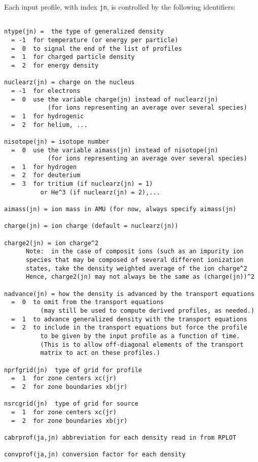 Each input profile, with index {\tt jn}, is controlled by the following
identifiers:
\begin{verbatim}

ntype(jn) =  the type of generalized density 
  = -1  for temperature (or energy per particle)
  =  0  to signal the end of the list of profiles
  =  1  for charged particle density
  =  2  for energy density
             
nuclearz(jn) = charge on the nucleus
  = -1  for electrons
  =  0  use the variable charge(jn) instead of nuclearz(jn)
            (for ions representing an average over several species)
  =  1  for hydrogenic
  =  2  for helium, ...

nisotope(jn) = isotope number
  =  0  use the variable aimass(jn) instead of nisotope(jn)
            (for ions representing an average over several species)
  =  1  for hydrogen
  =  2  for deuterium
  =  3  for tritium (if nuclearz(jn) = 1) 
          or He^3 (if nuclearz(jn) = 2),...

aimass(jn) = ion mass in AMU (for now, always specify aimass(jn)

charge(jn) = ion charge (default = nuclearz(jn))

charge2(jn) = ion charge^2
      Note:  in the case of composit ions (such as an impurity ion
      species that may be composed of several different ionization
      states, take the density weighted average of the ion charge^2
      Hence, charge2(jn) may not always be the same as (charge(jn))^2

nadvance(jn) = how the density is advanced by the transport equations
  =  0  to omit from the transport equations
          (may still be used to compute derived profiles, as needed.)
  =  1  to advance generalized density with the transport equations
  =  2  to include in the transport equations but force the profile
          to be given by the input profile as a function of time.
          (This is to allow off-diagonal elements of the transport
          matrix to act on these profiles.)

nprfgrid(jn)  type of grid for profile
  =  1  for zone centers xc(jr)
  =  2  for zone boundaries xb(jr)

nsrcgrid(jn)  type of grid for source
  =  1  for zone centers xc(jr)
  =  2  for zone boundaries xb(jr)

cabrprof(ja,jn) abbreviation for each density read in from RPLOT

convprof(ja,jn) conversion factor for each density


\end{verbatim}
